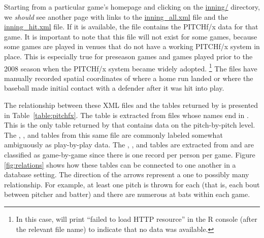 \begin{article}
Starting from a particular game's homepage and clicking on the
\href{http://gd2.mlb.com/components/game/mlb/year_2011/month_02/day_26/gid_2011_02_26_phimlb_nyamlb_1/inning/}{inning/}
directory, we \emph{should} see another page with links to the
\href{http://gd2.mlb.com/components/game/mlb/year_2011/month_02/day_26/gid_2011_02_26_phimlb_nyamlb_1/inning/inning_all.xml}{inning\_all.xml}
file and the
\href{http://gd2.mlb.com/components/game/mlb/year_2011/month_02/day_26/gid_2011_02_26_phimlb_nyamlb_1/inning/inning_hit.xml}{inning\_hit.xml}
file. If it is available, the  file contains the
PITCHf/x data for that game. It is important to note that this file
will not exist for some games, because some games are played in venues
that do not have a working PITCHf/x system in place. This is
especially true for preseason games and games played prior to the 2008
season when the PITCHf/x system became widely adopted.%
\footnote{In this case,  will print ``failed to load HTTP
  resource'' in the R console (after the relevant file name) to
  indicate that no data was available.%
} The  files have manually recorded spatial coordinates
of where a home run landed or where the baseball made initial contact
with a defender after it was hit into play.

The relationship between these XML files and the tables returned by
 is presented in Table~\ref{table:pitchfx}. The
 table is extracted from files whose names end in
.  This is the only table returned by
 that contains data on the pitch-by-pitch level. The
, ,  and  tables from
this same file are commonly labeled somewhat ambiguously as
play-by-play data. The , , and 
tables are extracted from  and are classified as
game-by-game since there is one record per person per game. Figure
\ref{fig:relations} shows how these tables can be connected to one
another in a database setting. The direction of the arrows represent a
one to possibly many relationship. For example, at least one pitch is
thrown for each  (that is, each bout between pitcher and
batter) and there are numerous at bats within each game.


\end{article}
